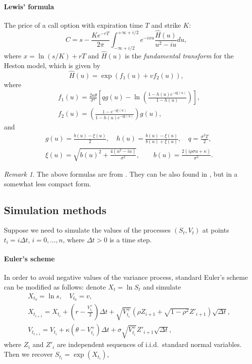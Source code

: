\documentclass[a4paper,11pt,titlepage]{article}
\renewcommand{\hat}{\widehat}
\theoremstyle{remark}
\newtheorem{remark}{Remark}
\begin{document}
\paragraph{Lewis' formula \citep{Lewis00}}
The price of a call option with expiration time $T$ and strike $K$:
\[
C = s - \frac{Ke^{-rT}}{2\pi} 
\int_{-\infty+i/2}^{+\infty+i/2} e^{-ixu} \frac{\hat H(u)}{u^2 - iu} du,
\]
where $x=\ln(s/K)+rT$ and $\hat H(u)$ is the \emph{fundamental transform} for
the Heston model, which is given by
\[
\hat H(u) = \exp(f_1(u) + vf_2(u)),
\]
where
\begin{align*}
&f_1(u) = \frac{2\kappa\theta}{\sigma^2}
  \left[ 
    qg(u) - \ln\left( \frac{1-h(u)e^{-q\xi(u)}}{1-h(u)} \right)
  \right],\\
&f_2(u) = \left( \frac{1-e^{-q\xi(u)}}{1-h(u)e^{-q\xi(u)}} \right)g(u),
\end{align*}
and
\begin{align*}
&g(u) = \frac{b(u) - \xi(u)}{2}, \quad 
h(u)  = \frac{b(u) - \xi(u)}{b(u) + \xi(u)}, \quad 
q     = \frac{\sigma^2T}{2},\\
&\xi(u) = \sqrt{b(u)^2 + \frac{4(u^2-iu)}{\sigma^2}}, \qquad 
b(u)    = \frac{2(i\rho\sigma u + \kappa)}{\sigma^2}.
\end{align*}
\begin{remark}
The above formulas are from \citet[Ch.~2]{Baustian+17}. They can be also found
in \cite{Lewis00}, but in a somewhat less compact form.
\end{remark}


\subsection{Simulation methods}
Suppose we need to simulate the values of the processes $(S_t, V_t)$ at points
$t_i = i \Delta t$, $i=0,\ldots,n$, where $\Delta t>0$ is a time step.

\paragraph{Euler's scheme} 
In order to avoid negative values of the variance process, standard Euler's
scheme can be modified as follows: denote $X_t = \ln S_t$ and simulate
\begin{align*}
&X_{t_0}     = \ln s, \quad V_{t_0} = v,\\
&X_{t_{i+1}} = X_{t_i} + \left(r -  \frac{V_{t_i}^+}2\right)\Delta t 
  + \sqrt{ V_{t_i}^+} \left(\rho Z_{i+1} + \sqrt{1-\rho^2} Z'_{i+1}\right)
    \sqrt{\Delta t}, \\
&V_{t_{t+i}} =  V_{t_i} + \kappa(\theta -  V_{t_i}^+) \Delta t +
  \sigma \sqrt{V_{t_i}^+} Z'_{i+1} \sqrt{\Delta t},
\end{align*}
where $Z_i$ and $Z'_i$ are independent sequences of i.i.d.\ standard normal
variables. Then we recover $S_{t_{i}} = \exp(X_{t_i})$,
\end{document}
